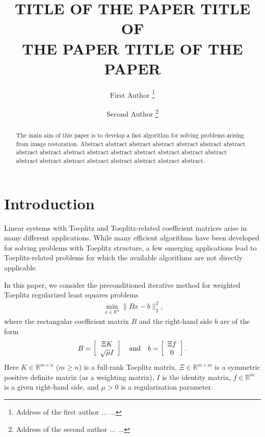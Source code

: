 \documentclass{article}
\newcommand{\R}{\mathbb{R}}
\begin{document}
\title{\uppercase{Title of the paper Title of \\ the paper Title of the paper}}

\author{
  First Author
    \thanks{Address of the first author ... ... }
  \and
  Second Author
    \thanks{Address of the second author ... ...}
}

\date{}

\maketitle

\begin{abstract}
The main aim of this paper is to develop a fast algorithm for solving
problems arising from image restoration.
Abstract abstract abstract abstract abstract abstract abstract abstract
abstract abstract abstract abstract abstract abstract abstract abstract
abstract abstract abstract abstract abstract abstract abstract abstract.
\end{abstract}

\section{Introduction}

Linear systems with Toeplitz and Toeplitz-related coefficient
matrices arise in many different applications.
While many efficient algorithms have been developed for solving problems
with Toeplitz structure, a few emerging applications lead to Toeplitz-related
problems for which the available algorithms are not directly applicable.

In this paper, we consider the preconditioned iterative method for
weighted Toeplitz regularized least squares problems
\begin{align}\label{wtls01}\
  \min_{x\in\R^n} \| B x - b \|_2^2,
\end{align}
where the rectangular coefficient matrix $B$ and
the right-hand side $b$ are of the form
$$
  B = \left[ \begin{array}{c} \Xi K \\ \sqrt{\mu} I \end{array} \right ]
  \quad {\rm and} \quad
  b = \left[ \begin{array}{c} \Xi f \\ 0  \end{array} \right ].
$$
Here $K\in\R^{m\times n}$ ($m\geq n$) is a full-rank Toeplitz matrix,
$\Xi \in\R^{m\times m}$ is a symmetric positive definite matrix (as a weighting matrix),
$I$ is the identity matrix,
$f\in\R^m$ is a given right-hand side,
and $\mu>0$ is a regularization parameter.
\end{document}
